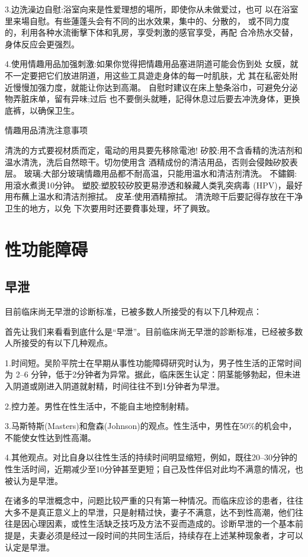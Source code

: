 \documentclass[12pt,UTF8]{ctexbook}
\begin{document}
3.边洗澡边自慰:浴室向来是性爱理想的場所，即使你从未做爱过，也可
以在浴室里来場自慰。有些蓮蓬头会有不同的出水效果，集中的、分散的，
或不同力度的，利用各种水流衝擊下体和乳房，享受刺激的感官享受，再配
合冷热水交替，身体反应会更强烈。

4.使用情趣用品加强刺激:如果你觉得把情趣用品塞进阴道可能会伤到处
女膜，就不一定要把它们放进阴道，用这些工具遊走身体的每一吋肌肤，尤
其在私密处附近慢慢加强力度，就能让你达到高潮。
自慰时建议在床上墊条浴巾，可避免分泌物弄脏床单，留有异味;过后
也不要倒头就睡，記得休息过后要去冲洗身体，更换底裤，以确保卫生。

情趣用品清洗注意事项

清洗的方式要视材质而定，電动的用具要先移除電池!
矽胶:用不含香精的洗洁剂和温水清洗，洗后自然晾干。切勿使用含
酒精成份的清洁用品，否则会侵蝕矽胶表层。
玻璃:大部分玻璃情趣用品都不耐高温，只能用温水和清洁剂清洗。
不鏽鋼:用滾水煮燙10分钟。
塑胶:塑胶较矽胶更易滲透和躲藏人类乳突病毒
(HPV)，最好用布蘸上温水和清洁剂擦拭。
皮革:使用酒精擦拭。
清洗晾干后要記得存放在干净卫生的地方，以免
下次要用时还要費事处理，坏了興致。

\part{性功能障碍}

\chapter{早泄}

目前临床尚无早泄的诊断标准，已被多数人所接受的有以下几种观点：

首先让我们来看看到底什么是“早泄”。目前临床尚无早泄的診断标准，已经被多数人所接受的有以下几种观点。

1.时间短。吴阶平院士在早期从事性功能障碍研究时认为，男子性生活的正常时间为 2--6 分钟，低于2分钟者为异常。据此，临床医生认定：阴茎能够勃起，但未进入阴道或刚进入阴道就射精，时间往往不到1分钟者为早泄。

2.控力差。男性在性生活中，不能自主地控制射精。

3.马斯特斯(Masters)和詹森(Johnson)的观点。性生活中，男性在50\%的机会中，不能使女性达到性高潮。

4.其他观点。对比自身以往性生活的持续时间明显缩短，例如，既往20--30分钟的性生活时间，近期减少至10分钟甚至更短；自己及性伴侣对此均不满意的情况，也被认为是早泄。

在诸多的早泄概念中，问题比较严重的只有第一种情况。而临床应诊的患者，往往大多不是真正意义上的早泄，只是射精过快，妻子不满意，达不到性高潮，他们往往是因心理因素，或性生活缺乏技巧及方法不妥而造成的。诊断早泄的一个基本前提是，夫妻必须是经过一段时间的共同生活后，持续存在上述某种现象者，才可以认定是早泄。
\end{document}
